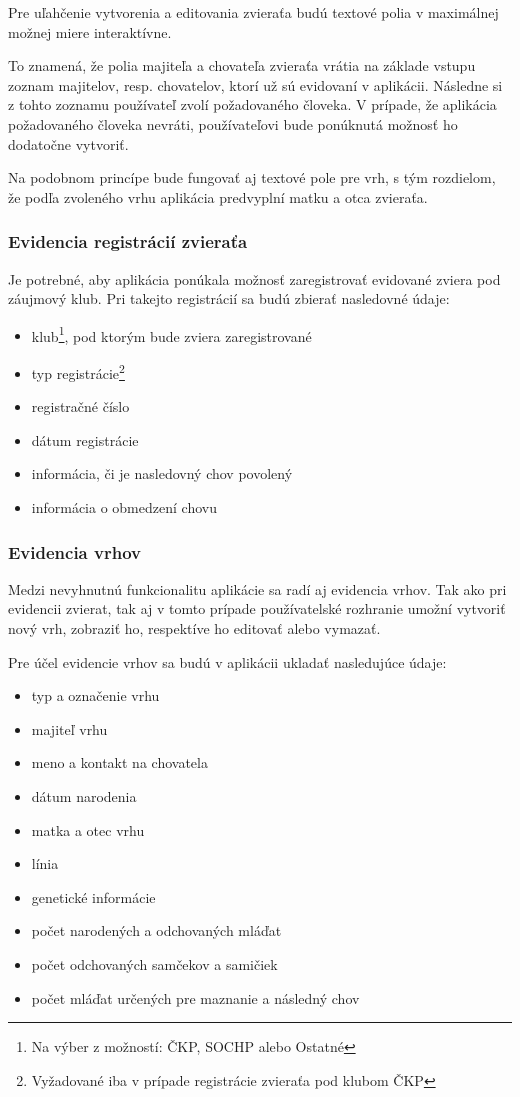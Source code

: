 Pre uľahčenie vytvorenia a editovania zvieraťa budú textové polia v maximálnej možnej miere interaktívne.

To znamená, že polia majiteľa a chovateľa zvieraťa vrátia na základe vstupu zoznam majitelov, resp. chovatelov, ktorí už sú evidovaní v aplikácii. Následne si z tohto zoznamu používateľ zvolí požadovaného človeka.
V prípade, že aplikácia požadovaného človeka nevráti, používateľovi bude ponúknutá možnosť ho dodatočne vytvoriť.

Na podobnom princípe bude fungovať aj textové pole pre vrh, s tým rozdielom, že podľa zvoleného vrhu aplikácia predvyplní matku a otca zvieraťa.
 
\subsubsection{Evidencia registrácií zvieraťa}\label{evidencia-registracii-zvierata}
Je potrebné, aby aplikácia ponúkala možnosť zaregistrovať evidované zviera pod záujmový klub.
Pri takejto registrácií sa budú zbierať nasledovné údaje:

\begin{itemize}
	\item klub\footnote{Na výber z možností: ČKP, SOCHP alebo Ostatné}, pod ktorým bude zviera zaregistrované
	\item typ registrácie\footnote{Vyžadované iba v prípade registrácie zvieraťa pod klubom ČKP}
	\item registračné číslo
	\item dátum registrácie
	\item informácia, či je nasledovný chov povolený
	\item informácia o obmedzení chovu
\end{itemize}

\subsubsection{Evidencia vrhov}
Medzi nevyhnutnú funkcionalitu aplikácie sa radí aj evidencia vrhov. Tak ako pri evidencii zvierat, tak aj v tomto prípade používatelské rozhranie umožní vytvoriť nový vrh, zobraziť ho, respektíve ho editovať alebo vymazať. 

\hfill \break
Pre účel evidencie vrhov sa budú v aplikácii ukladať nasledujúce údaje:

\begin{itemize}
	\item typ a označenie vrhu
	\item majiteľ vrhu
	\item meno a kontakt na chovatela
	\item dátum narodenia
	\item matka a otec vrhu
	\item línia
	\item genetické informácie
	\item počet narodených a odchovaných mláďat
	\item počet odchovaných samčekov a samičiek
	\item počet mláďat určených pre maznanie a následný chov
\end{itemize}

